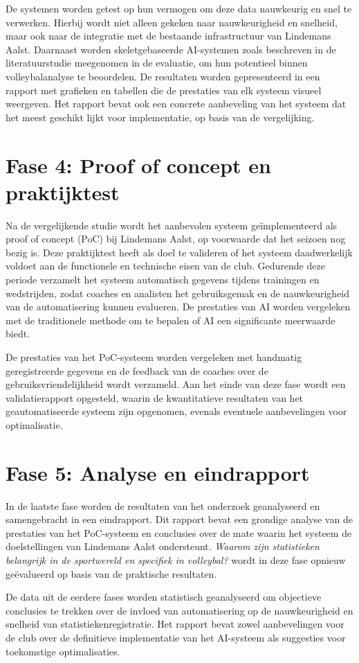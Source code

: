 De systemen worden getest op hun vermogen om deze data nauwkeurig en snel te verwerken. Hierbij wordt niet alleen gekeken naar nauwkeurigheid en snelheid, maar ook naar de integratie met de bestaande infrastructuur van Lindemans Aalst. Daarnaast worden skeletgebaseerde AI-systemen zoals beschreven in de literatuurstudie meegenomen in de evaluatie, om hun potentieel binnen volleybalanalyse te beoordelen. De resultaten worden gepresenteerd in een rapport met grafieken en tabellen die de prestaties van elk systeem visueel weergeven. Het rapport bevat ook een concrete aanbeveling van het systeem dat het meest geschikt lijkt voor implementatie, op basis van de vergelijking.

\section{Fase 4: Proof of concept en praktijktest}
Na de vergelijkende studie wordt het aanbevolen systeem geïmplementeerd als proof of concept (PoC) bij Lindemans Aalst, op voorwaarde dat het seizoen nog bezig is. Deze praktijktest heeft als doel te valideren of het systeem daadwerkelijk voldoet aan de functionele en technische eisen van de club. Gedurende deze periode verzamelt het systeem automatisch gegevens tijdens trainingen en wedstrijden, zodat coaches en analisten het gebruiksgemak en de nauwkeurigheid van de automatisering kunnen evalueren. De prestaties van AI worden vergeleken met de traditionele methode om te bepalen of AI een significante meerwaarde biedt.

De prestaties van het PoC-systeem worden vergeleken met handmatig geregistreerde gegevens en de feedback van de coaches over de gebruiksvriendelijkheid wordt verzameld. Aan het einde van deze fase wordt een validatierapport opgesteld, waarin de kwantitatieve resultaten van het geautomatiseerde systeem zijn opgenomen, evenals eventuele aanbevelingen voor optimalisatie.

\section{Fase 5: Analyse en eindrapport}
In de laatste fase worden de resultaten van het onderzoek geanalyseerd en samengebracht in een eindrapport. Dit rapport bevat een grondige analyse van de prestaties van het PoC-systeem en conclusies over de mate waarin het systeem de doelstellingen van Lindemans Aalst ondersteunt. \textit{Waarom zijn statistieken belangrijk in de sportwereld en specifiek in volleybal?} wordt in deze fase opnieuw geëvalueerd op basis van de praktische resultaten.

De data uit de eerdere fases worden statistisch geanalyseerd om objectieve conclusies te trekken over de invloed van automatisering op de nauwkeurigheid en snelheid van statistiekenregistratie. Het rapport bevat zowel aanbevelingen voor de club over de definitieve implementatie van het AI-systeem als suggesties voor toekomstige optimalisaties.
